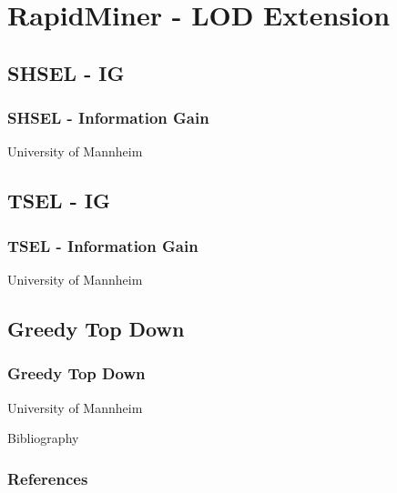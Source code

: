 \documentclass{beamer}
\begin{document}
\section{RapidMiner - LOD Extension}
\subsection{SHSEL - IG}
\begin{frame}
	\frametitle{SHSEL - Information Gain}
	University of Mannheim
\end{frame}
\subsection{TSEL - IG}
\begin{frame}
	\frametitle{TSEL - Information Gain}
	University of Mannheim
\end{frame}
\subsection{Greedy Top Down}
\begin{frame}
	\frametitle{Greedy Top Down}
	University of Mannheim
\end{frame}
\begin{frame}{Bibliography}
	\frametitle{References}
	
	
\end{frame}
\end{document}
